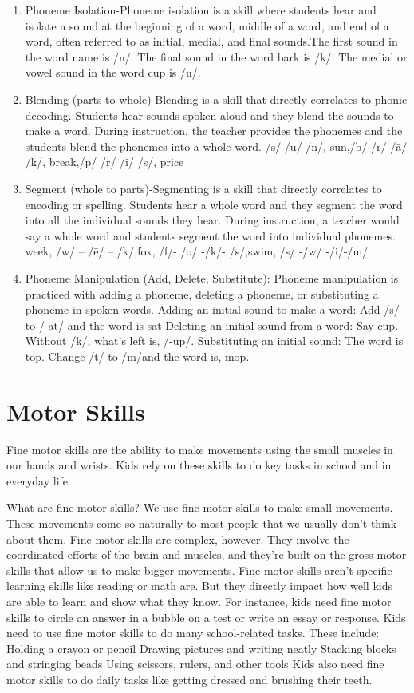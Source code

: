 \begin{enumerate}
\item Phoneme Isolation-Phoneme isolation is a skill where students hear and isolate a sound at the beginning of a word, middle of a word, and end of a word, often referred to as initial, medial, and final sounds.The first sound in the word name is /n/.
The final sound in the word bark is /k/.
The medial or vowel sound in the word cup is /u/.

\item Blending (parts to whole)-Blending is a skill that directly correlates to phonic decoding. Students hear sounds spoken aloud and they blend the sounds to make a word. During instruction, the teacher provides the phonemes and the students blend the phonemes into a whole word.	/s/ /u/ /n/, sun,/b/ /r/ /ā/ /k/, break,/p/ /r/ /i/ /s/, price

\item Segment (whole to parts)-Segmenting is a skill that directly correlates to encoding or spelling. Students hear a whole word and they segment the word into all the individual sounds they hear. During instruction, a teacher would say a whole word and students segment the word into individual phonemes.	week, /w/ – /ē/ – /k/,fox, /f/- /o/ -/k/- /s/,swim, /s/ -/w/ -/i/-/m/

\item Phoneme Manipulation (Add, Delete, Substitute): Phoneme manipulation is practiced with adding a phoneme, deleting a phoneme, or substituting a phoneme in spoken words.	Adding an initial sound to make a word: Add /s/ to /-at/ and the word is sat
Deleting an initial sound from a word: Say cup.  Without /k/, what’s left is, /-up/.
Substituting an initial sound:  The word is top. Change /t/ to /m/and the word is, mop.

\end{enumerate}

\section{Motor Skills}

Fine motor skills are the ability to make movements using the small muscles in our hands and wrists. Kids rely on these skills to do key tasks in school and in everyday life.

What are fine motor skills?
We use fine motor skills to make small movements. These movements come so naturally to most people that we usually don’t think about them. Fine motor skills are complex, however. They involve the coordinated efforts of the brain and muscles, and they’re built on the gross motor skills that allow us to make bigger movements.
Fine motor skills aren’t specific learning skills like reading or math are. But they directly impact how well kids are able to learn and show what they know. For instance, kids need fine motor skills to circle an answer in a bubble on a test or write an essay or response.
Kids need to use fine motor skills to do many school-related tasks. These include:
Holding a crayon or pencil
Drawing pictures and writing neatly
Stacking blocks and stringing beads
Using scissors, rulers, and other tools
Kids also need fine motor skills to do daily tasks like getting dressed and brushing their teeth.

